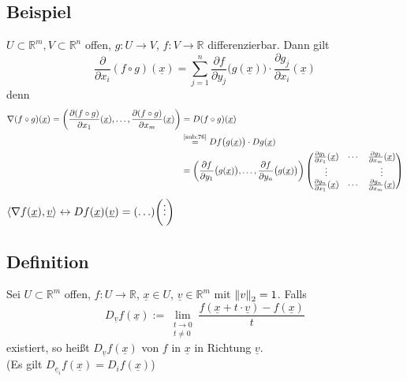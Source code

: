 \subsection{Beispiel} %
\label{sub:77}
$U \subset \mathds{R}^m, V \subset \mathds{R}^n$ offen, $g : U \to V$, $f: V \to \mathds{R}$ differenzierbar. Dann gilt 
\[
	\frac{\partial}{\partial x_i} (f \circ g) (\underline{x} ) = \sum_{j=1}^{n} \frac{\partial f}{\partial y_j} \big( g(\underline{x}) \big) \cdot  \frac{\partial g_j}{\partial x_i}
	(\underline{x} )  
\]
denn 
\begin{align*}
	\nabla (f \circ g)(\underline{x} ) = \enbrace*{ \diff{(f \circ g)}{x_1} (\underline{x} ), \ldots , \diff{(f \circ g)}{x_m} (\underline{x} )} &= D (f \circ g) (\underline{x} ) \\
	&\stackrel{\text{\ref{sub:76}}}{=} D f \big(g(\underline{x} )\big) \cdot D g (\underline{x} ) \\
	&= \enbrace*{ \diff{f}{y_1}\big( g(\underline{x} )\big), \ldots , \diff{f}{y_n} \big(g(\underline{x} )\big)  } \begin{pmatrix}
		\diff{g_1}{x_1}(\underline{x} ) & \cdots & \diff{g_1}{x_m} (\underline{x} ) \\
		\vdots & & \vdots \\
		\diff{g_n}{x_1} (\underline{x} ) & \cdots & \diff{g_n}{x_m} (\underline{x} )
	\end{pmatrix}  
\end{align*}
$\langle \nabla f(\underline{x}), \underline{v}\rangle \leftrightarrow D f(\underline{x}) (\underline{v}) = (\ldots ) \enbrace*{\vdots} $

\subsection[Definition: Richtungsableitung]{Definition} %
\label{sub:78}
Sei $U \subset \mathds{R}^m$ offen, $f : U \to \mathds{R}$, $\underline{x} \in U $, $\underline{v} \in \mathds{R}^m $ mit $\norm[2]{v}=1$. Falls 
\[
	D_{\underline{v} } f(\underline{x}) := \lim_{ \substack{t \to 0 \\ t \not= 0}} \frac{ f( \underline{x} + t \cdot \underline{v}) - f(\underline{x}) }{t}  
\]
existiert, so heißt $D_{\underline{v}} f(\underline{x})$  von $f$ in $\underline{x}$ in Richtung $\underline{v}$. \\
(Es gilt $D_{\underline{e}_i } f(\underline{x}) = D_i f(\underline{x})$)

